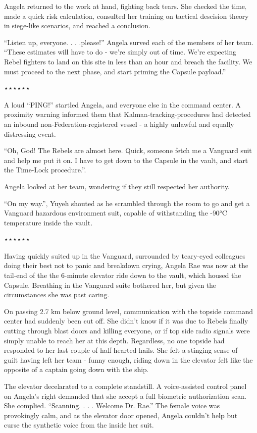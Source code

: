 \documentclass[smalldemyvopaper,11pt,twoside,onecolumn,openright,extrafontsizes]{memoir}
\begin{document}
 
  Angela returned to the work at hand, fighting back tears. She checked the time, made a quick risk calculation, consulted her training on tactical descision theory in siege-like scenarios, and reached a conclusion.

 
  “Listen up, everyone. . . .please!” Angela surved each of the members of her team. “These estimates will have to do - we’re simply out of time. We’re expecting Rebel fighters to land on this site in less than an hour and breach the facility. We must proceed to the next phase, and start priming the Capsule payload.”

⋆⋆⋆⋆⋆⋆

A loud “PING!” startled Angela, and everyone else in the command center. A proximity warning informed them that Kalman-tracking-procedures had detected an inbound non-Federation-registered vessel - a highly unlawful and equally distressing event.

 
“Oh, God! The Rebels are almost here. Quick, someone fetch me a Vanguard suit and help me put it on. I have to get down to the Capsule in the vault, and start the Time-Lock procedure.”.

 
  Angela looked at her team, wondering if they still respected her authority.

 
  “On my way.”, Yuyeh shouted as he scrambled through the room to go and get a Vanguard hazardous environment suit, capable of withstanding the -90°C temperature inside the vault.

⋆⋆⋆⋆⋆⋆


Having quickly suited up in the Vanguard, surrounded by teary-eyed colleagues doing their best not to panic and breakdown crying, Angela Rae was now at the tail-end of the the 6-minute elevator ride down to the vault, which housed the Capsule. Breathing in the Vanguard suite bothered her, but given the circumstances she was past caring.

 On passing 2.7 km below ground level, communication with the topside command center had suddenly been cut off. She didn’t know if it was due to Rebels finally cutting through blast doors and killing everyone, or if top side radio signals were simply unable to reach her at this depth. Regardless, no one topside had responded to her last couple of half-hearted hails. She felt a stinging sense of guilt having left her team - funny enough, riding down in the elevator felt like the opposite of a captain going down with the ship.

 
 The elevator decelarated to a complete standstill. A voice-assisted control panel on Angela’s right demanded that she accept a full biometric authorization scan. She complied. “Scanning. . . . Welcome Dr. Rae.” The female voice was provokingly calm, and as the elevator door opened, Angela couldn’t help but curse the synthetic voice from the inside her suit.
\end{document}
